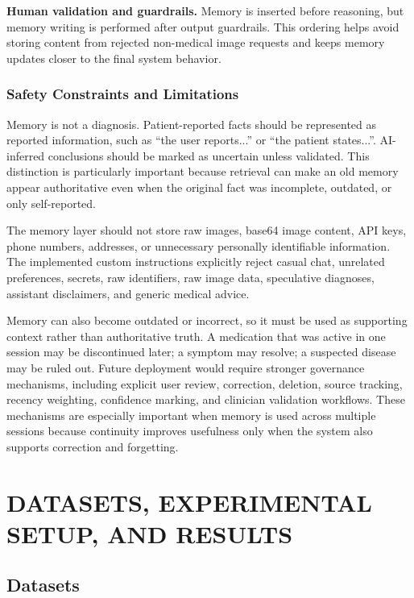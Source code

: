 \textbf{Human validation and guardrails.} Memory is inserted before reasoning, but memory writing is performed after output guardrails. This ordering helps avoid storing content from rejected non-medical image requests and keeps memory updates closer to the final system behavior.

\subsection{Safety Constraints and Limitations}

Memory is not a diagnosis. Patient-reported facts should be represented as reported information, such as ``the user reports...'' or ``the patient states...''. AI-inferred conclusions should be marked as uncertain unless validated. This distinction is particularly important because retrieval can make an old memory appear authoritative even when the original fact was incomplete, outdated, or only self-reported.

The memory layer should not store raw images, base64 image content, API keys, phone numbers, addresses, or unnecessary personally identifiable information. The implemented custom instructions explicitly reject casual chat, unrelated preferences, secrets, raw identifiers, raw image data, speculative diagnoses, assistant disclaimers, and generic medical advice.

Memory can also become outdated or incorrect, so it must be used as supporting context rather than authoritative truth. A medication that was active in one session may be discontinued later; a symptom may resolve; a suspected disease may be ruled out. Future deployment would require stronger governance mechanisms, including explicit user review, correction, deletion, source tracking, recency weighting, confidence marking, and clinician validation workflows. These mechanisms are especially important when memory is used across multiple sessions because continuity improves usefulness only when the system also supports correction and forgetting.

\chapter{DATASETS, EXPERIMENTAL SETUP, AND RESULTS}

\section{Datasets}

